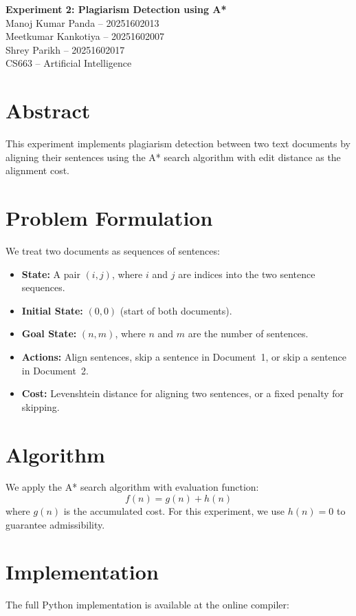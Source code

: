 \documentclass[12pt,a4paper]{article}
\begin{document}
\begin{center}
    {\Large \textbf{Experiment 2: Plagiarism Detection using A*}} \\
    \vspace{0.5cm}
    Manoj Kumar Panda -- 20251602013 \\
    Meetkumar Kankotiya -- 20251602007 \\
    Shrey Parikh -- 20251602017 \\
    CS663 -- Artificial Intelligence \\
\end{center}

\section*{Abstract}
This experiment implements plagiarism detection between two text documents by aligning their sentences using the A* search algorithm with edit distance as the alignment cost.

\section*{Problem Formulation}
We treat two documents as sequences of sentences:
\begin{itemize}
    \item \textbf{State:} A pair $(i,j)$, where $i$ and $j$ are indices into the two sentence sequences.
    \item \textbf{Initial State:} $(0,0)$ (start of both documents).
    \item \textbf{Goal State:} $(n,m)$, where $n$ and $m$ are the number of sentences.
    \item \textbf{Actions:} Align sentences, skip a sentence in Document~1, or skip a sentence in Document~2.
    \item \textbf{Cost:} Levenshtein distance for aligning two sentences, or a fixed penalty for skipping.
\end{itemize}

\section*{Algorithm}
We apply the A* search algorithm with evaluation function:
\[
f(n) = g(n) + h(n)
\]
where $g(n)$ is the accumulated cost. For this experiment, we use $h(n)=0$ to guarantee admissibility.

\section*{Implementation}
The full Python implementation is available at the online compiler:
\end{document}
